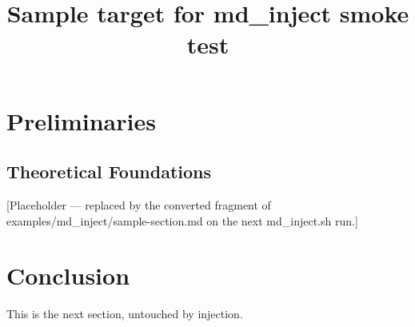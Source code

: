 \documentclass[11pt]{article}
\title{Sample target for md\_inject smoke test}
\date{}
\begin{document}
\maketitle

\section{Preliminaries}
\label{sec:prelim}

\subsection{Theoretical Foundations}
\label{sec:theory}

[Placeholder — replaced by the converted fragment of
examples/md\_inject/sample-section.md on the next md\_inject.sh run.]


\section{Conclusion}
This is the next section, untouched by injection.


\end{document}
